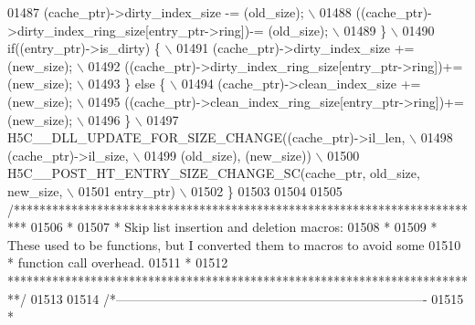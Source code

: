 \begin{DoxyCode}
01487 \textcolor{preprocessor}{    (cache\_ptr)->dirty\_index\_size -= (old\_size);                        \(\backslash\)}
01488 \textcolor{preprocessor}{        ((cache\_ptr)->dirty\_index\_ring\_size[entry\_ptr->ring])-= (old\_size); \(\backslash\)}
01489 \textcolor{preprocessor}{    \}                                                                       \(\backslash\)}
01490 \textcolor{preprocessor}{    if((entry\_ptr)->is\_dirty) \{                                             \(\backslash\)}
01491 \textcolor{preprocessor}{        (cache\_ptr)->dirty\_index\_size += (new\_size);                        \(\backslash\)}
01492 \textcolor{preprocessor}{        ((cache\_ptr)->dirty\_index\_ring\_size[entry\_ptr->ring])+= (new\_size); \(\backslash\)}
01493 \textcolor{preprocessor}{    \} else \{                                                                \(\backslash\)}
01494 \textcolor{preprocessor}{    (cache\_ptr)->clean\_index\_size += (new\_size);                        \(\backslash\)}
01495 \textcolor{preprocessor}{        ((cache\_ptr)->clean\_index\_ring\_size[entry\_ptr->ring])+= (new\_size); \(\backslash\)}
01496 \textcolor{preprocessor}{    \}                                                                       \(\backslash\)}
01497 \textcolor{preprocessor}{    H5C\_\_DLL\_UPDATE\_FOR\_SIZE\_CHANGE((cache\_ptr)->il\_len,                    \(\backslash\)}
01498 \textcolor{preprocessor}{                                    (cache\_ptr)->il\_size,                   \(\backslash\)}
01499 \textcolor{preprocessor}{                                    (old\_size), (new\_size))                 \(\backslash\)}
01500 \textcolor{preprocessor}{    H5C\_\_POST\_HT\_ENTRY\_SIZE\_CHANGE\_SC(cache\_ptr, old\_size, new\_size,        \(\backslash\)}
01501 \textcolor{preprocessor}{                                      entry\_ptr)                            \(\backslash\)}
01502 \textcolor{preprocessor}{\}}
01503 
01504 
01505 \textcolor{comment}{/**************************************************************************}
01506 \textcolor{comment}{ *}
01507 \textcolor{comment}{ * Skip list insertion and deletion macros:}
01508 \textcolor{comment}{ *}
01509 \textcolor{comment}{ * These used to be functions, but I converted them to macros to avoid some}
01510 \textcolor{comment}{ * function call overhead.}
01511 \textcolor{comment}{ *}
01512 \textcolor{comment}{ **************************************************************************/}
01513 
01514 \textcolor{comment}{/*-------------------------------------------------------------------------}
01515 \textcolor{comment}{ *}

\end{DoxyCode}
